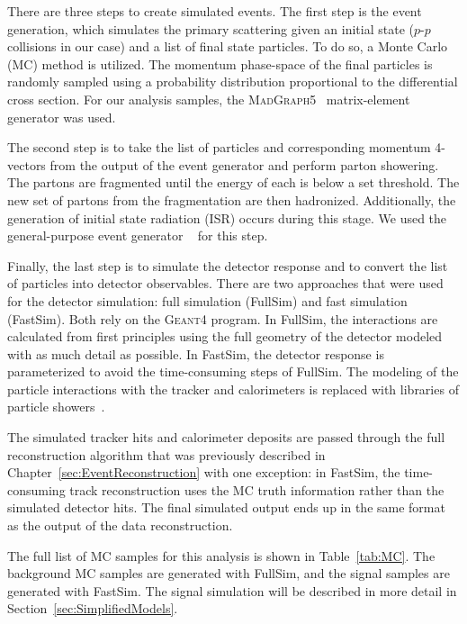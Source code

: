 There are three steps to create simulated events. The first step is the 
event generation, which simulates the primary scattering given an 
initial state ($p$-$p$ collisions in our case) and a list of final state particles.
To do so, a Monte Carlo (MC) method is utilized. The momentum phase-space
of the final particles is randomly sampled using a probability distribution
proportional to the differential cross section. For our analysis samples,
the \textsc{MadGraph}5~\cite{Alwall:2014hca} matrix-element generator was used.

The second step is to take the list of particles and corresponding 
momentum 4-vectors from the output of the event generator and 
perform parton showering. The partons are fragmented 
until the energy of each is below a set threshold. 
The new set of partons from the fragmentation 
are then hadronized. Additionally, the generation of initial state radiation
(ISR) occurs during this stage. 
We used the general-purpose event generator 
~\cite{Sjostrand:2007gs} for this step.

Finally, the last step is to simulate the detector response and to convert the list
of particles into detector observables. There are two approaches that were used
for the detector simulation: full simulation (FullSim) and fast simulation (FastSim). Both
rely on the \textsc{Geant}4 program.
In FullSim, the interactions are calculated from first principles using the full 
geometry of the detector modeled with as much detail as possible. In FastSim, 
the detector response is parameterized to avoid the time-consuming steps of FullSim. 
The modeling of the particle interactions 
with the tracker and calorimeters is replaced with libraries of particle showers~\cite{Abdullin:2011zz}.

The simulated tracker hits and calorimeter deposits are passed through the
full reconstruction algorithm that was previously described in
Chapter~\ref{sec:EventReconstruction} with one exception: in FastSim, the time-consuming track 
reconstruction uses the MC truth information rather than the simulated
detector hits. The final simulated output ends up in the same format as the output of the 
data reconstruction.

The full list of MC samples for this analysis is shown in Table~\ref{tab:MC}.
The background MC samples are generated with FullSim, and the signal samples 
are generated with FastSim. The signal simulation will be described in more detail in Section~\ref{sec:SimplifiedModels}. 

